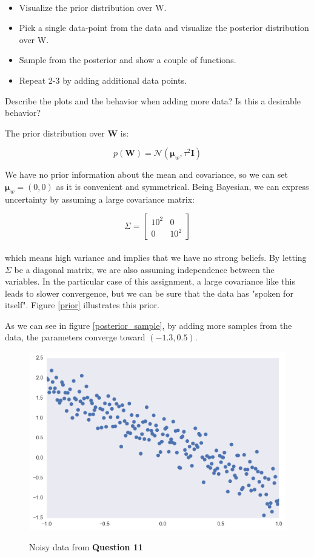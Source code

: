 \documentclass[12pt]{article}
\newenvironment{question}[2][Question]{\begin{trivlist}
\kern10pt
\item[\hskip \labelsep {\bfseries #1}\hskip \labelsep {\bfseries #2.}]}{\end{trivlist}}
\newcommand*{\answer}{%
  \par
  \kern1pt
  \begingroup
    \centering
    \raisebox{.2\baselineskip}{%
      \textcolor{gray}{
	    \rule{.6667\linewidth}{.1pt}%
      }
    }%
    \par
  \kern8pt
  \endgroup
}
\begin{document}
\begin{question}{11}
$ $
\begin{itemize}
\item Visualize the prior distribution over W.
\item Pick a single data-point from the data and visualize the posterior distribution over W.
\item Sample from the posterior and show a couple of functions.
\item Repeat 2-3 by adding additional data points.
\end{itemize}

Describe the plots and the behavior when adding more data? Is this a desirable behavior?
\answer

The prior distribution over $\boldsymbol{W}$ is:

$$p(\boldsymbol{W}) = \mathcal{N}(\boldsymbol{\mu}_w, \tau^2\boldsymbol{I})$$

We have no prior information about the mean and covariance, so we can set $\boldsymbol{\mu}_w = (0, 0)$ as it is convenient and symmetrical. Being Bayesian, we can express uncertainty by assuming a large covariance matrix:

$$\Sigma = \begin{bmatrix}10^2 & 0 \\ 0 & 10^2\end{bmatrix}$$
\\
which means high variance and implies that we have no strong beliefs. By letting $\Sigma$ be a diagonal matrix, we are also assuming independence between the variables. In the particular case of this assignment, a large covariance like this leads to slower convergence, but we can be sure that the data has "spoken for itself". Figure \ref{prior} illustrates this prior.

As we can see in figure \ref{posterior_sample}, by adding more samples from the data, the parameters converge toward $(-1.3, 0.5)$.

\begin{figure}
\caption{Noisy data from \textbf{Question 11}}
\includegraphics[scale=.6]{noisy_data}
\centering
\label{noisy_data}
\end{figure}


\end{question}
\end{document}
